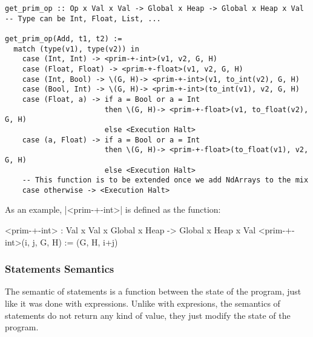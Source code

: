 \begin{verbatim}
get_prim_op :: Op x Val x Val -> Global x Heap -> Global x Heap x Val
-- Type can be Int, Float, List, ...

get_prim_op(Add, t1, t2) :=
  match (type(v1), type(v2)) in
    case (Int, Int) -> <prim-+-int>(v1, v2, G, H)
    case (Float, Float) -> <prim-+-float>(v1, v2, G, H)
    case (Int, Bool) -> \(G, H)-> <prim-+-int>(v1, to_int(v2), G, H)
    case (Bool, Int) -> \(G, H)-> <prim-+-int>(to_int(v1), v2, G, H)
    case (Float, a) -> if a = Bool or a = Int
                       then \(G, H)-> <prim-+-float>(v1, to_float(v2), G, H)
                       else <Execution Halt>
    case (a, Float) -> if a = Bool or a = Int
                       then \(G, H)-> <prim-+-float>(to_float(v1), v2, G, H)
                       else <Execution Halt>
    -- This function is to be extended once we add NdArrays to the mix
    case otherwise -> <Execution Halt>
\end{verbatim}

As an example, \pycode|<prim-+-int>| is defined as the function:

\begin{pythoncode}
<prim-+-int> : Val x Val x Global x Heap -> Global x Heap x Val
<prim-+-int>(i, j, G, H) := (G, H, i+j)
\end{pythoncode}

\subsubsection*{Statements Semantics}

The semantic of statements is a function between the state of the
program, just like it was done with expressions. Unlike with expresions,
the semantics of statements do not return any kind of value, they just
modify the state of the program.

